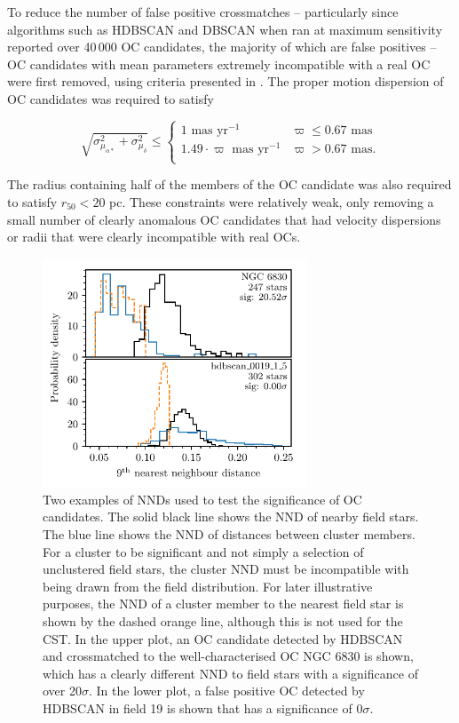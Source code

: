 To reduce the number of false positive crossmatches -- particularly since algorithms such as HDBSCAN and DBSCAN when ran at maximum sensitivity reported over 40$\,$000 OC candidates, the majority of which are false positives -- OC candidates with mean parameters extremely incompatible with a real OC were first removed, using criteria presented in \cite{cantat-gaudin_clusters_2020}. The proper motion dispersion of OC candidates was required to satisfy

\begin{equation}\label{c2:eqn:proper_motion}
\sqrt{\sigma_{\mu_{\alpha*}}^2+\sigma_{\mu_{\delta}}^2} \leq
  \begin{cases}
    1 \text{ mas yr}^{-1}                  & \varpi \leq 0.67 \text{ mas} \\
    1.49 \cdot \varpi \text{ mas yr}^{-1}  & \varpi >    0.67 \text{ mas.} \\
  \end{cases} 
\end{equation}

\noindent
The radius containing half of the members of the OC candidate was also required to satisfy $r_{50} < 20$ pc. These constraints were relatively weak, only removing a small number of clearly anomalous OC candidates that had velocity dispersions or radii that were clearly incompatible with real OCs.

\begin{figure}[t]
   \centering
   \includegraphics[width=0.7\textwidth]{fig/c2/fig_nn_distances.pdf}
   \caption{Two examples of NNDs used to test the significance of OC candidates. The solid black line shows the NND of nearby field stars. The blue line shows the NND of distances between cluster members. For a cluster to be significant and not simply a selection of unclustered field stars, the cluster NND must be incompatible with being drawn from the field distribution. For later illustrative purposes, the NND of a cluster member to the nearest field star is shown by the dashed orange line, although this is not used for the CST. In the upper plot, an OC candidate detected by HDBSCAN and crossmatched to the well-characterised OC NGC 6830 is shown, which has a clearly different NND to field stars with a significance of over 20$\sigma$. In the lower plot, a false positive OC detected by HDBSCAN in field 19 is shown that has a significance of 0$\sigma$.}\label{c2:fig:nn_distances}%
\end{figure}

